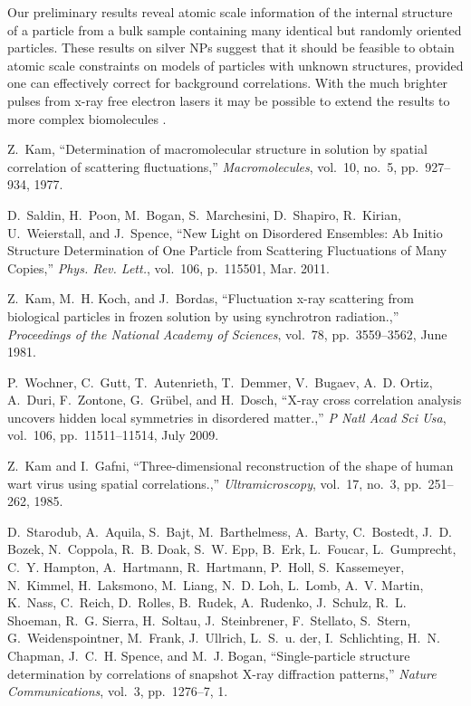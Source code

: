 \documentclass [11pt,fleqn]{article}
\begin{document}
Our preliminary results reveal atomic scale information of the internal structure of a particle from a bulk sample containing many identical  but randomly oriented particles. These results on silver NPs suggest that it should be feasible to obtain atomic scale constraints on models of particles with unknown structures, provided one can effectively correct for background correlations. With the much brighter pulses from x-ray free electron lasers it may be possible to extend the results to more complex biomolecules \cite{Neutze:2000ih, Spence:2012eo}. 



%
%
%
%
\begin{thebibliography}{10}

Z.~Kam, ``{Determination of macromolecular structure in solution by spatial
  correlation of scattering fluctuations},'' {\em Macromolecules}, vol.~10,
  no.~5, pp.~927--934, 1977.

D.~Saldin, H.~Poon, M.~Bogan, S.~Marchesini, D.~Shapiro, R.~Kirian,
  U.~Weierstall, and J.~Spence, ``{New Light on Disordered Ensembles: Ab Initio
  Structure Determination of One Particle from Scattering Fluctuations of Many
  Copies},'' {\em Phys. Rev. Lett.}, vol.~106, p.~115501, Mar. 2011.

Z.~Kam, M.~H. Koch, and J.~Bordas, ``{Fluctuation x-ray scattering from
  biological particles in frozen solution by using synchrotron radiation.},''
  {\em Proceedings of the National Academy of Sciences}, vol.~78,
  pp.~3559--3562, June 1981.

P.~Wochner, C.~Gutt, T.~Autenrieth, T.~Demmer, V.~Bugaev, A.~D. Ortiz, A.~Duri,
  F.~Zontone, G.~Gr{\"u}bel, and H.~Dosch, ``{X-ray cross correlation analysis
  uncovers hidden local symmetries in disordered matter.},'' {\em P Natl Acad
  Sci Usa}, vol.~106, pp.~11511--11514, July 2009.

Z.~Kam and I.~Gafni, ``{Three-dimensional reconstruction of the shape of human
  wart virus using spatial correlations.},'' {\em Ultramicroscopy}, vol.~17,
  no.~3, pp.~251--262, 1985.

D.~Starodub, A.~Aquila, S.~Bajt, M.~Barthelmess, A.~Barty, C.~Bostedt, J.~D.
  Bozek, N.~Coppola, R.~B. Doak, S.~W. Epp, B.~Erk, L.~Foucar, L.~Gumprecht,
  C.~Y. Hampton, A.~Hartmann, R.~Hartmann, P.~Holl, S.~Kassemeyer, N.~Kimmel,
  H.~Laksmono, M.~Liang, N.~D. Loh, L.~Lomb, A.~V. Martin, K.~Nass, C.~Reich,
  D.~Rolles, B.~Rudek, A.~Rudenko, J.~Schulz, R.~L. Shoeman, R.~G. Sierra,
  H.~Soltau, J.~Steinbrener, F.~Stellato, S.~Stern, G.~Weidenspointner,
  M.~Frank, J.~Ullrich, L.~S.~u. der, I.~Schlichting, H.~N. Chapman, J.~C.~H.
  Spence, and M.~J. Bogan, ``{Single-particle structure determination by
  correlations of snapshot X-ray diffraction patterns},'' {\em Nature
  Communications}, vol.~3, pp.~1276--7, 1.


\end{thebibliography}
\end{document}
